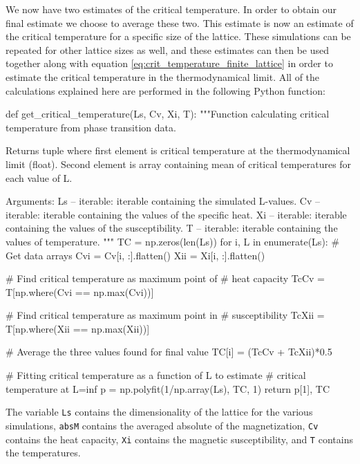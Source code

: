 \documentclass[reprint,english,notitlepage]{revtex4-1}  %
\begin{document}
We now have two estimates of the critical temperature. In order to obtain our final estimate we choose to average these two. This estimate is now an estimate of the critical temperature for a specific size of the lattice. These simulations can be repeated for other lattice sizes as well, and these estimates can then be used together along with equation \eqref{eq:crit_temperature_finite_lattice} in order to estimate the critical temperature in the thermodynamical limit. All of the calculations explained here are performed in the following Python function:

\begin{python}
def get_critical_temperature(Ls, Cv, Xi, T):
    """Function calculating critical temperature from phase
    transition data.

    Returns tuple where first element is critical temperature at
    the thermodynamical limit (float). Second element is array
    containing mean of critical temperatures for each value of L.

    Arguments:
    Ls -- iterable: iterable containing the simulated L-values.
    Cv -- iterable: iterable containing the values of the specific
    				heat.
    Xi -- iterable: iterable containing the values of the
    				susceptibility.
    T -- iterable: iterable containing the values of
    			   temperature.
    """
    TC = np.zeros(len(Ls))
    for i, L in enumerate(Ls):
        # Get data arrays
        Cvi = Cv[i, :].flatten()
        Xii = Xi[i, :].flatten()

        # Find critical temperature as maximum point of
        # heat capacity
        TcCv = T[np.where(Cvi == np.max(Cvi))]

        # Find critical temperature as maximum point in
        # susceptibility
        TcXii = T[np.where(Xii == np.max(Xii))]

        # Average the three values found for final value
        TC[i] = (TcCv + TcXii)*0.5

    # Fitting critical temperature as a function of L to estimate
    # critical temperature at L=inf
    p = np.polyfit(1/np.array(Ls), TC, 1)
    return p[1], TC
\end{python} 

The variable \verb+Ls+ contains the dimensionality of the lattice for the various simulations, \verb+absM+ contains the averaged absolute of the magnetization, \verb+Cv+ contains the heat capacity, \verb+Xi+ contains the magnetic susceptibility, and \verb+T+ contains the temperatures. 
\end{document}
